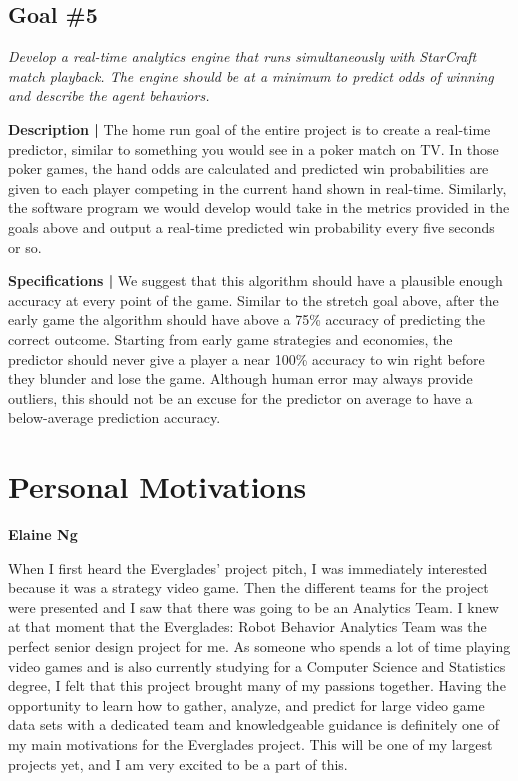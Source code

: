 \documentclass[a4paper,12pt]{report}
\newcommand{\msection}[1]{\noindent\textbf{#1}}
\begin{document}
\subsection{Goal \#5}

\textit{Develop a real-time analytics engine that runs simultaneously with StarCraft match playback. The engine should be at a minimum to predict odds of winning and describe the agent behaviors.}

\textbf{Description |} The home run goal of the entire project is to create a real-time predictor, similar to something you would see in a poker match on TV. In those poker games, the hand odds are calculated and predicted win probabilities are given to each player competing in the current hand shown in real-time. Similarly, the software program we would develop would take in the metrics provided in the goals above and output a real-time predicted win probability every five seconds or so.

\textbf{Specifications |} We suggest that this algorithm should have a plausible enough accuracy at every point of the game. Similar to the stretch goal above, after the early game the algorithm should have above a 75\% accuracy of predicting the correct outcome. Starting from early game strategies and economies, the predictor should never give a player a near 100\% accuracy to win right before they blunder and lose the game. Although human error may always provide outliers, this should not be an excuse for the predictor on average to have a below-average prediction accuracy.  

\section{Personal Motivations}

\msection{Elaine Ng}

When I first heard the Everglades’ project pitch, I was immediately interested because it was a strategy video game. Then the different teams for the project were presented and I saw that there was going to be an Analytics Team. I knew at that moment that the Everglades: Robot Behavior Analytics Team was the perfect senior design project for me. As someone who spends a lot of time playing video games and is also currently studying for a Computer Science and Statistics degree, I felt that this project brought many of my passions together. Having the opportunity to learn how to gather, analyze, and predict for large video game data sets with a dedicated team and knowledgeable guidance is definitely one of my main motivations for the Everglades project. This will be one of my largest projects yet, and I am very excited to be a part of this.
\end{document}
